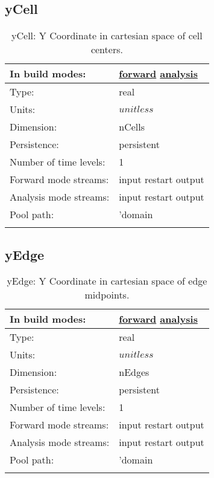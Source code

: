 \subsection[yCell]{yCell}
\label{subsec:var_sec_mesh_yCell}
\begin{center}
\begin{longtable}{| p{2.0in} | p{4.0in} |}
        \hline 
        In build modes: & \hyperref[subsec:forward_var_tab_mesh]{forward} \hyperref[subsec:analysis_var_tab_mesh]{analysis} \\
        \hline 
        Type: & real \\
        \hline 
        Units: & $unitless$ \\
        \hline 
        Dimension: & nCells \\
        \hline 
        Persistence: & persistent \\
        \hline 
        Number of time levels: & 1 \\
        \hline 
		 Forward mode streams: &  input restart output \\
        \hline 
		 Analysis mode streams: &  input restart output \\
        \hline 
            Pool path: & 'domain %
 \\
		 \hline 
    \caption{yCell: Y Coordinate in cartesian space of cell centers.}
\end{longtable}
\end{center}
\subsection[yEdge]{yEdge}
\label{subsec:var_sec_mesh_yEdge}
\begin{center}
\begin{longtable}{| p{2.0in} | p{4.0in} |}
        \hline 
        In build modes: & \hyperref[subsec:forward_var_tab_mesh]{forward} \hyperref[subsec:analysis_var_tab_mesh]{analysis} \\
        \hline 
        Type: & real \\
        \hline 
        Units: & $unitless$ \\
        \hline 
        Dimension: & nEdges \\
        \hline 
        Persistence: & persistent \\
        \hline 
        Number of time levels: & 1 \\
        \hline 
		 Forward mode streams: &  input restart output \\
        \hline 
		 Analysis mode streams: &  input restart output \\
        \hline 
            Pool path: & 'domain %
 \\
		 \hline 
    \caption{yEdge: Y Coordinate in cartesian space of edge midpoints.}
\end{longtable}
\end{center}
